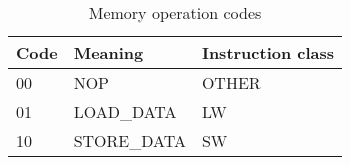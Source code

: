\begin{table}[h]
\centering
    \begin{tabular}{| l | l | l |}
     \hline
     Code  & Meaning      & Instruction class \\
     \hline
     00    & NOP          &   OTHER          \\
     01    & LOAD\_DATA   &   LW             \\
     10    & STORE\_DATA  &   SW             \\
    \hline
    \end{tabular}
    
    \caption{Memory operation codes}
    \label{fpga:tbl:mem_op_code_tbl}
    

\end{table}
